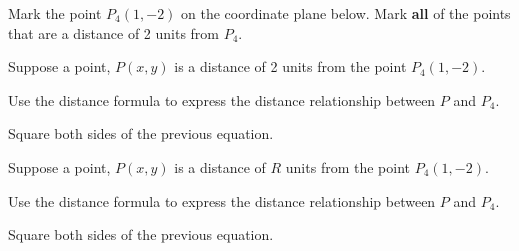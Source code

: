 \begin{problem}
  \vfill


\clearpage

\item Mark the point $P_4(1,-2)$ on the coordinate plane below. Mark \textbf{all}
  of the points that are a distance of 2 units from $P_4$.


  \vfill


\clearpage

\item Suppose a point, $P(x,y)$ is a distance of 2 units from the
  point $P_4(1,-2)$.
  \begin{subproblem}
  \item Use the distance formula to express the distance relationship
    between $P$ and $P_4$.
    \vfill
  \item Square both sides of the previous equation.
    \vfill
  \end{subproblem}

\item Suppose a point, $P(x,y)$ is a distance of $R$ units from the
  point $P_4(1,-2)$.
  \begin{subproblem}
  \item Use the distance formula to express the distance relationship
    between $P$ and $P_4$.
    \vfill
  \item Square both sides of the previous equation.
    \vfill
  \end{subproblem}

\end{problem}


